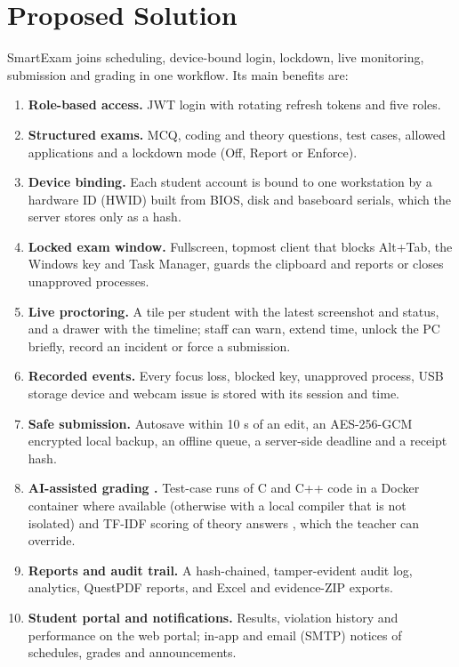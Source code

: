 \section{Proposed Solution}

SmartExam joins scheduling, device-bound login, lockdown, live monitoring, submission and grading in one workflow. Its main benefits are:

\begin{enumerate}[noitemsep]
\item \textbf{Role-based access.} JWT login \cite{rfc7519} with rotating refresh tokens \cite{rfc9700} and five roles.
\item \textbf{Structured exams.} MCQ, coding and theory questions, test cases, allowed applications and a lockdown mode (Off, Report or Enforce).
\item \textbf{Device binding.} Each student account is bound to one workstation by a hardware ID (HWID) built from BIOS, disk and baseboard serials, which the server stores only as a hash.
\item \textbf{Locked exam window.} Fullscreen, topmost client that blocks Alt+Tab, the Windows key and Task Manager, guards the clipboard and reports or closes unapproved processes.
\item \textbf{Live proctoring.} A tile per student with the latest screenshot and status, and a drawer with the timeline; staff can warn, extend time, unlock the PC briefly, record an incident or force a submission.
\item \textbf{Recorded events.} Every focus loss, blocked key, unapproved process, USB storage device and webcam issue is stored with its session and time.
\item \textbf{Safe submission.} Autosave within 10 s of an edit, an AES-256-GCM encrypted local backup, an offline queue, a server-side deadline and a receipt hash.
\item \textbf{AI-assisted grading \cite{eassess1}.} Test-case runs \cite{alamutka2005} of C and C++ code in a Docker container where available (otherwise with a local compiler that is not isolated) and TF-IDF scoring of theory answers \cite{salton1988}, which the teacher can override.
\item \textbf{Reports and audit trail.} A hash-chained, tamper-evident audit log, analytics, QuestPDF reports, and Excel and evidence-ZIP exports.
\item \textbf{Student portal and notifications.} Results, violation history and performance on the web portal; in-app and email (SMTP) notices of schedules, grades and announcements.
\end{enumerate}
